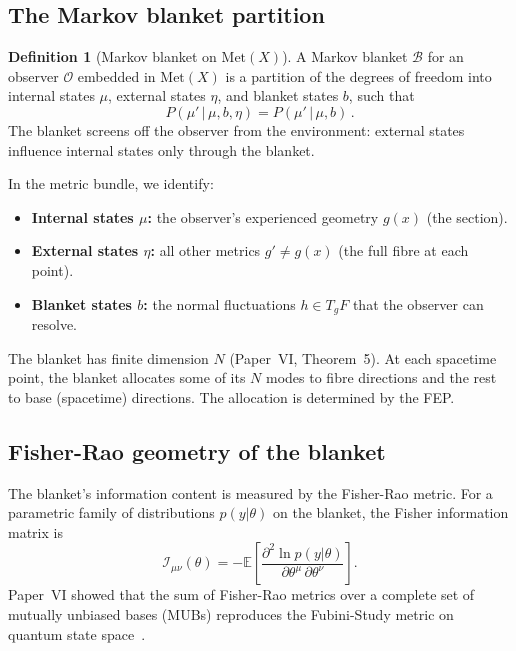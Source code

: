 \documentclass[12pt, a4paper]{article}
\theoremstyle{definition}
\newtheorem{definition}[theorem]{Definition}
\theoremstyle{remark}
\newcommand{\Met}{\mathrm{Met}}
\begin{document}
\subsection{The Markov blanket partition}

\begin{definition}[Markov blanket on $\Met(X)$]
\label{def:blanket}
A Markov blanket $\mathcal{B}$ for an observer $\mathcal{O}$ embedded in $\Met(X)$ is a partition of the degrees of freedom into internal states $\mu$, external states $\eta$, and blanket states $b$, such that
\begin{equation}
P(\mu' \,|\, \mu, b, \eta) = P(\mu' \,|\, \mu, b)\,.
\end{equation}
The blanket screens off the observer from the environment: external states influence internal states only through the blanket.
\end{definition}

In the metric bundle, we identify:
\begin{itemize}[nosep]
\item \textbf{Internal states $\mu$:} the observer's experienced geometry $g(x)$ (the section).
\item \textbf{External states $\eta$:} all other metrics $g' \neq g(x)$ (the full fibre at each point).
\item \textbf{Blanket states $b$:} the normal fluctuations $h \in T_g F$ that the observer can resolve.
\end{itemize}

The blanket has finite dimension $N$ (Paper~VI, Theorem~5).
At each spacetime point, the blanket allocates some of its $N$ modes to fibre directions and the rest to base (spacetime) directions.
The allocation is determined by the FEP.

\subsection{Fisher-Rao geometry of the blanket}

The blanket's information content is measured by the Fisher-Rao metric.
For a parametric family of distributions $p(y|\theta)$ on the blanket, the Fisher information matrix is
\begin{equation}
\label{eq:fisher}
\mathcal{I}_{\mu\nu}(\theta) = -\mathbb{E}\!\left[\frac{\partial^2 \ln p(y|\theta)}{\partial \theta^\mu \,\partial \theta^\nu}\right].
\end{equation}
Paper~VI showed that the sum of Fisher-Rao metrics over a complete set of mutually unbiased bases (MUBs) reproduces the Fubini-Study metric on quantum state space~\cite{Paper6}.
\end{document}

